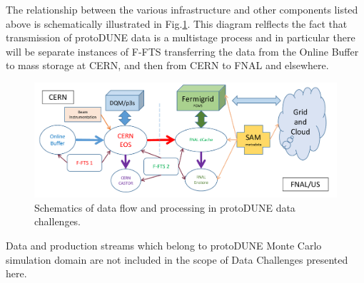\documentclass[pdftex,12pt,letter]{article}
\newcommand{\pd}{protoDUNE\xspace}
\begin{document}
\noindent The relationship between the various infrastructure and other components listed above is schematically illustrated in
Fig.\ref{fig:dc1}. This diagram relflects the fact that transmission of \pd data is a multistage process and in particular there
will be separate instances of F-FTS transferring the data from the Online Buffer to mass storage at CERN, and then from
CERN to FNAL and elsewhere.

\begin{figure}[tbh]
  \centering
  \includegraphics[width=1.0\textwidth]{../figures/data_challenge_1.pdf}
  \caption{Schematics of data flow and  processing in \pd data challenges.}
  \label{fig:dc1}
\end{figure}
\noindent Data and production streams which belong to \pd Monte Carlo simulation domain are not included in the
scope of Data Challenges presented here.
\end{document}
